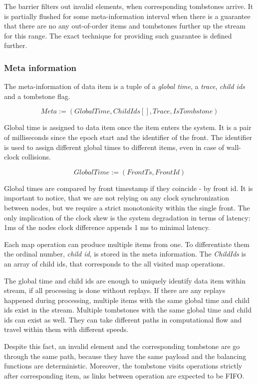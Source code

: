 The barrier filters out invalid elements, when corresponding tombstones arrive. It is partially flushed for some meta-information interval when there is a guarantee that there are no any out-of-order items and tombstones further up the stream for this range. The exact technique for providing such guarantee is defined further.

\subsubsection{Meta information}
The meta-information of data item is a tuple of a {\it global time}, a {\it trace}, {\it child ids} and a tombstone flag.

\[Meta := (GlobalTime, ChildIds[], Trace, IsTombstone)\]

Global time is assigned to data item once the item enters the system. It is a pair of milliseconds since the epoch start and the identifier of the front. The identifier is used to assign different global times to different items, even in case of wall-clock collisions. 

\[GlobalTime := (FrontTs, FrontId)\]

Global times are compared by front timestamp if they coincide - by front id. It is important to notice, that we are not relying on any clock synchronization between nodes, but we require a strict monotonicity within the single front. The only implication of the clock skew is the system degradation in terms of latency: 1ms of the nodes clock difference appends 1 ms to minimal latency.

Each map operation can produce multiple items from one. To differentiate them the ordinal number, {\it child id}, is stored in the meta information. The {\it ChildIds } is an array of child ids, that corresponds to the all visited map operations.

The global time and child ids are enough to uniquely identify data item within stream, if all processing is done without replays. If there are any replays happened during processing, multiple items with the same global time and child ids exist in the stream. Multiple tombstones with the same global time and child ids can exist as well. They can take different paths in computational flow and travel within them with different speeds. 

Despite this fact, an invalid element and the corresponding tombstone are go through the same path, because they have the same payload and the balancing functions are deterministic. Moreover, the tombstone visits operations strictly after corresponding item, as links between operation are expected to be FIFO. 

